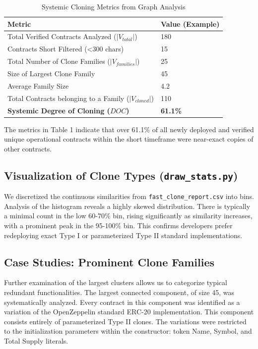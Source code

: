 \documentclass[12pt,a4paper]{article}
\begin{document}
\begin{table}[h]
\centering
\caption{Systemic Cloning Metrics from Graph Analysis}
\vspace{0.3cm}
\begin{tabular}{@{}ll@{}}
\toprule
\textbf{Metric} & \textbf{Value (Example)} \\ \midrule
Total Verified Contracts Analyzed ($|V_{total}|$) & 180 \\
Contracts Short Filtered (<300 chars) & 15 \\
Total Number of Clone Families ($|V_{families}|$) & 25 \\
Size of Largest Clone Family & 45 \\
Average Family Size & 4.2 \\
Total Contracts belonging to a Family ($|V_{cloned}|$) & 110 \\
\textbf{Systemic Degree of Cloning ($DOC$)} & \textbf{61.1\%} \\ \bottomrule
\end{tabular}
\label{tab:metrics}
\end{table}

The metrics in Table 1 indicate that over 61.1\% of all newly deployed and verified unique operational contracts within the short timeframe were near-exact copies of other contracts. 

\subsection{Visualization of Clone Types (\texttt{draw\_stats.py})}
We discretized the continuous similarities from \texttt{fast\_clone\_report.csv} into bins. Analysis of the histogram reveals a highly skewed distribution. There is typically a minimal count in the low 60-70\% bin, rising significantly as similarity increases, with a prominent peak in the 95-100\% bin. This confirms developers prefer redeploying exact Type I or parameterized Type II standard implementations.

\subsection{Case Studies: Prominent Clone Families}
Further examination of the largest clusters allows us to categorize typical redundant functionalities. The largest connected component, of size 45, was systematically analyzed. Every contract in this component was identified as a variation of the OpenZeppelin standard ERC-20 implementation. This component consists entirely of parameterized Type II clones. The variations were restricted to the initialization parameters within the constructor: token Name, Symbol, and Total Supply literals. 
\end{document}
